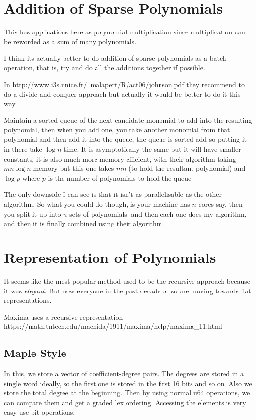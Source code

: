 \section{Addition of Sparse Polynomials}

This has applications here as polynomial multiplication since multiplication can be reworded as a sum of many polynomials.

I think its actually better to do addition of sparse polynomials as a batch operation, that is, try and do all the additions together if possible.

In http://www.i3s.unice.fr/~malapert/R/act06/johnson.pdf they recommend to do a divide and conquer approach but actually it would be better to do it this way

Maintain a sorted queue of the next candidate monomial to add into the resulting polynomial, then when you add one, you take another monomial from that polynomial and then add it into the queue, the queue is sorted add so putting it in there take $\log n$ time. It is asymptotically the same but it will have smaller constants, it is also much more memory efficient, with their algorithm taking $mn\log n$ memory but this one takes $mn$ (to hold the resultant polynomial) and $\log p$ where $p$ is the number of polynomials to hold the queue.

The only downside I can see is that it isn't as parallelisable as the other algorithm. So what you could do though, is your machine has $n$ cores say, then you split it up into $n$ sets of polynomials, and then each one does my algorithm, and then it is finally combined using their algorithm.

\section{Representation of Polynomials}

It seems like the most popular method used to be the recursive approach because it was \emph{elegant}. But now everyone in the past decade or so are moving towards flat representations.

Maxima uses a recursive representation https://math.tntech.edu/machida/1911/maxima/help/maxima_11.html

\subsection{Maple Style}%
\label{sub:Maple Style}

In this, we store a vector of coefficient-degree pairs. The degrees are stored in a single word ideally, so the first one is stored in the first 16 bits and so on. Also we store the total degree at the beginning. Then by using normal u64 operations, we can compare them and get a graded lex ordering. Accessing the elements is very easy use bit operations.

